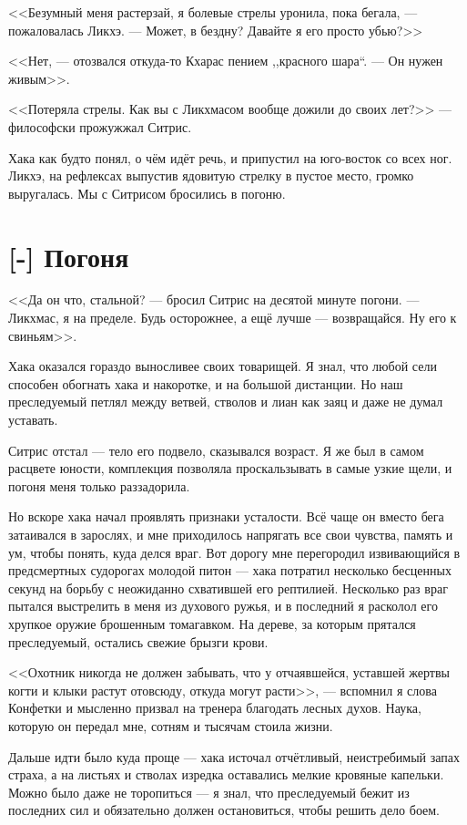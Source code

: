<<Безумный меня растерзай, я болевые стрелы уронила, пока бегала, --- пожаловалась Ликхэ.
--- Может, в бездну?
Давайте я его просто убью?>>

<<Нет, --- отозвался откуда-то Кхарас пением ,,красного шара``.
--- Он нужен живым>>.

<<Потеряла стрелы.
Как вы с Ликхмасом вообще дожили до своих лет?>> --- философски прожужжал Ситрис.

Хака как будто понял, о чём идёт речь, и припустил на юго-восток со всех ног.
Ликхэ, на рефлексах выпустив ядовитую стрелку в пустое место, громко выругалась.
Мы с Ситрисом бросились в погоню.

\section{[-] Погоня}

<<Да он что, стальной? --- бросил Ситрис на десятой минуте погони.
--- Ликхмас, я на пределе.
Будь осторожнее, а ещё лучше --- возвращайся.
Ну его к свиньям>>.

Хака оказался гораздо выносливее своих товарищей.
Я знал, что любой сели способен обогнать хака и накоротке, и на большой дистанции.
Но наш преследуемый петлял между ветвей, стволов и лиан как заяц и даже не думал уставать.

Ситрис отстал --- тело его подвело, сказывался возраст.
Я же был в самом расцвете юности, комплекция позволяла проскальзывать в самые узкие щели, и погоня меня только раззадорила.

Но вскоре хака начал проявлять признаки усталости.
Всё чаще он вместо бега затаивался в зарослях, и мне приходилось напрягать все свои чувства, память и ум, чтобы понять, куда делся враг.
Вот дорогу мне перегородил извивающийся в предсмертных судорогах молодой питон --- хака потратил несколько бесценных секунд на борьбу с неожиданно схватившей его рептилией.
Несколько раз враг пытался выстрелить в меня из духового ружья, и в последний я расколол его хрупкое оружие брошенным томагавком.
На дереве, за которым прятался преследуемый, остались свежие брызги крови.

<<Охотник никогда не должен забывать, что у отчаявшейся, уставшей жертвы когти и клыки растут отовсюду, откуда могут расти>>, --- вспомнил я слова Конфетки и мысленно призвал на тренера благодать лесных духов.
Наука, которую он передал мне, сотням и тысячам стоила жизни.

Дальше идти было куда проще --- хака источал отчётливый, неистребимый запах страха, а на листьях и стволах изредка оставались мелкие кровяные капельки.
Можно было даже не торопиться --- я знал, что преследуемый бежит из последних сил и обязательно должен остановиться, чтобы решить дело боем.

